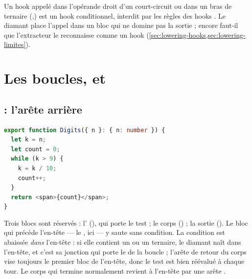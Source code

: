 \begin{react}
Un hook appelé dans l'opérande droit d'un court-circuit ou dans un bras de ternaire (,) est un hook conditionnel, interdit par les règles des hooks \cite{ReactRulesOfHooks}. Le diamant place l'appel dans un bloc qui ne domine pas la sortie ; encore faut-il que l'extracteur le reconnaisse comme un hook (\cref{sec:lowering-hooks,sec:lowering-limites}).
\end{react}

\section{Les boucles,  et }
\label{sec:lowering-boucles}

\subsection{ : l'arête arrière}

\begin{lstlisting}[language=TypeScript,caption={Une boucle \code{while} (\file{/tmp/ch07/c2_while.tsx})},label={lst:lowering-while-src}]
export function Digits({ n }: { n: number }) {
  let k = n;
  let count = 0;
  while (k > 9) {
    k = k / 10;
    count++;
  }
  return <span>{count}</span>;
}
\end{lstlisting}



Trois blocs sont réservés : l' (), qui porte le test ; le corps () ; la sortie (). Le bloc qui précède l'en-tête --- le , ici  --- y saute sans condition. La condition est abaissée \emph{dans} l'en-tête : si elle contient un \code{&&} ou un ternaire, le diamant naît dans l'en-tête, et c'est sa jonction qui porte le  de la boucle ; l'arête de retour du corps vise toujours le premier bloc de l'en-tête, donc le test est bien réévalué à chaque tour. Le corps qui termine normalement revient à l'en-tête par une arête .

